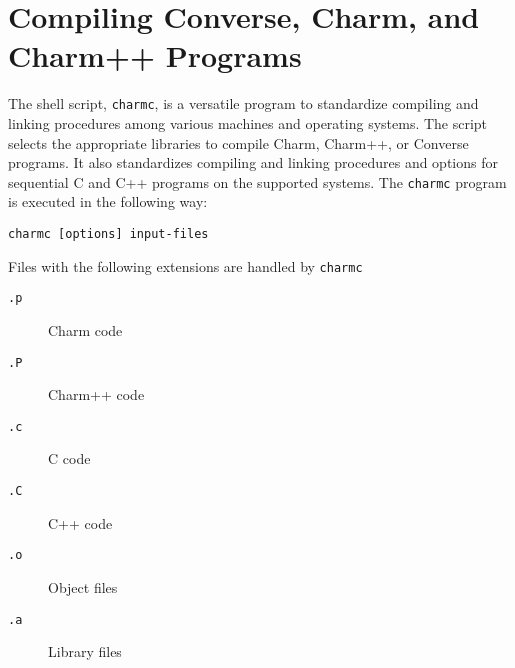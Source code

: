 %
%
%
%
%
%

\section{Compiling Converse, Charm, and Charm++ Programs}

The shell script, {\tt charmc}, is a versatile program to standardize
compiling and linking procedures among various machines and operating
systems.  The script selects the appropriate libraries to compile
Charm, Charm++, or Converse programs.  It also standardizes compiling
and linking procedures and options for sequential C and C++ programs
on the supported systems.  The {\tt charmc} program is executed in the
following way:

\begin{verbatim}
charmc [options] input-files
\end{verbatim}

Files with the following extensions are handled by {\verb+charmc+}
\begin{description}
\item[{\verb+.p+}] Charm code
\item[{\verb+.P+}] Charm++ code
\item[{\verb+.c+}] C code
\item[{\verb+.C+}] C++ code
\item[{\verb+.o+}] Object files
\item[{\verb+.a+}] Library files
\end{description}


